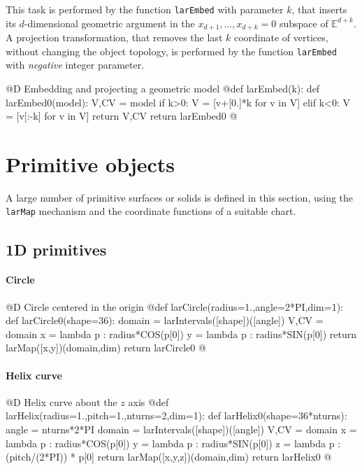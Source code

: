 \documentclass[11pt,oneside]{article}	%
\def\E{\mathbb{E}}
\begin{document}
This task is performed by the function \texttt{larEmbed} with parameter $k$, that inserts its $d$-dimensional geometric argument in the $x_{d+1}, \ldots, x_{d+k}=0$ subspace of $\E^{d+k}$.
A projection transformation, that removes the last $k$ coordinate of vertices, without changing the object topology, is performed by the function \texttt{larEmbed} with \emph{negative} integer parameter.


@D Embedding and projecting a geometric model
@{def larEmbed(k):
	def larEmbed0(model):
		V,CV = model
		if k>0:
			V = [v+[0.]*k for v in V] 
		elif k<0:
			V = [v[:-k] for v in V] 
		return V,CV
	return larEmbed0
@}


\section{Primitive objects}
\label{sec:generators}

A large number of primitive surfaces or solids is defined in this section, using the \texttt{larMap} mechanism and the coordinate functions of a suitable chart.

\subsection{1D primitives}

\paragraph{Circle}
@D Circle centered in the origin
@{def larCircle(radius=1.,angle=2*PI,dim=1):
	def larCircle0(shape=36):
		domain = larIntervals([shape])([angle])
		V,CV = domain
		x = lambda p : radius*COS(p[0])
		y = lambda p : radius*SIN(p[0])
		return larMap([x,y])(domain,dim)
	return larCircle0
@}
\paragraph{Helix curve}
@D Helix curve about the $z$ axis
@{def larHelix(radius=1.,pitch=1.,nturns=2,dim=1):
	def larHelix0(shape=36*nturns):
		angle = nturns*2*PI
		domain = larIntervals([shape])([angle])
		V,CV = domain
		x = lambda p : radius*COS(p[0])
		y = lambda p : radius*SIN(p[0])
		z = lambda p : (pitch/(2*PI)) * p[0]
		return larMap([x,y,z])(domain,dim)
	return larHelix0
@}
\end{document}
